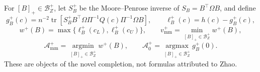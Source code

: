 For \([B]_+\in\mathcal B_Z^+\), let \(S_B^+\) be the Moore--Penrose inverse of \(S_B=B^{\top}\Omega B\), and define
\[
g_B^+(c)=n^{-2}\operatorname{tr}\!\left[S_B^+B^{\top}\Omega\Pi^{-1}Q(c)\Pi^{-1}\Omega B\right],
\qquad \ell_B^+(c)=h(c)-g_B^+(c),
\]
\[
w^+(B)=\max\{\ell_B^+(c_L),\ell_B^+(c_U)\},
\qquad v_{\mathrm{mm}}^+=\min_{[B]_+\in\mathcal B_Z^+}w^+(B),
\]
\[
\mathcal A_{\mathrm{mm}}^+=\operatorname*{argmin}_{[B]_+\in\mathcal B_Z^+}w^+(B),
\qquad \mathcal A_0^+=\operatorname*{argmax}_{[B]_+\in\mathcal B_Z^+}g_B^+(0).
\]
These are objects of the novel completion, not formulas attributed to Zhao.